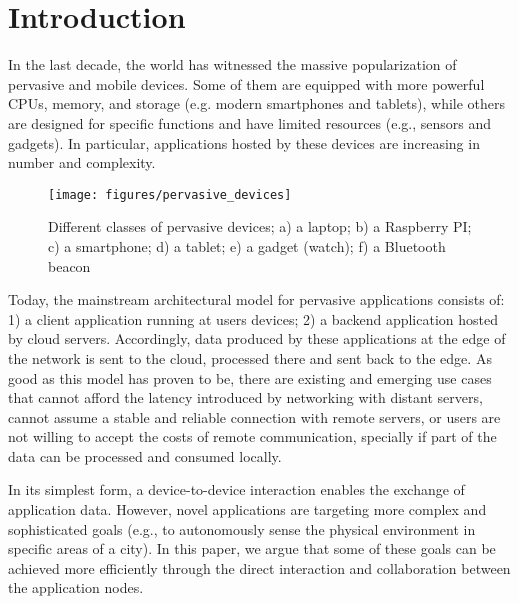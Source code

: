 \section{Introduction}
\label{sec:intro}


In the last decade, the world has witnessed the massive popularization of pervasive and mobile devices. Some of them are equipped with more powerful CPUs, memory, and storage (e.g. modern smartphones and tablets), while others are designed for specific functions and have limited resources (e.g., sensors and gadgets). In particular, applications hosted by these devices are increasing in number and complexity. 

\begin{figure}[t!]
	\centering
	\texttt{[image: figures/pervasive\_devices]}
	\caption{Different classes of pervasive devices; a) a laptop; b) a Raspberry PI; c) a smartphone; d) a tablet; e) a gadget (watch); f) a Bluetooth beacon}
	\label{fig:pervasive_devices}
\end{figure}

Today, the mainstream architectural model for pervasive applications consists of: 1) a client application running at users devices; 2) a backend application hosted by cloud servers. Accordingly, data produced by these applications at the edge of the network is sent to the cloud, processed there and sent back to the edge. As good as this model has proven to be, there are existing and emerging use cases that cannot afford the latency introduced by networking with distant servers, cannot assume a stable and reliable connection with remote servers, or users are not willing to accept the costs of remote communication, specially if part of the data can be processed and consumed locally.

In its simplest form, a device-to-device interaction enables the exchange of application data. However, novel applications are targeting more complex and sophisticated goals (e.g., to autonomously sense the physical environment in specific areas of a city). In this paper, we argue that some of these goals can be achieved more efficiently through the direct interaction and collaboration between the application nodes. %

